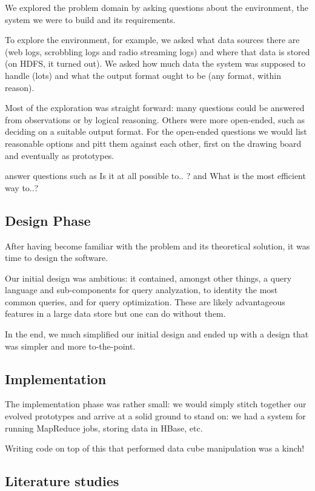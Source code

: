 We explored the problem domain by asking questions about the environment, the
system we were to build and its requirements.

To explore the environment, for example, we asked what data sources there are
(web logs, scrobbling logs and radio streaming logs) and where that data is
stored (on HDFS, it turned out). We asked how much data the system was supposed
to handle (lots) and what the output format ought to be (any format, within
reason).

Most of the exploration was straight forward: many questions could be answered
from observations or by logical reasoning. Others were more open-ended, such as
deciding on a suitable output format. For the open-ended questions we would list
reasonable options and pitt them against each other, first on the drawing board
and eventually as prototypes.

answer questions such as Is it at all possible to.. ? and What is the most
efficient way to..?

\subsection*{Design Phase}

After having become familiar with the problem and its theoretical solution, it
was time to design the software.

Our initial design was ambitious: it contained, amongst other things, a query
language and sub-components for query analyzation, to identity the most common
queries, and for query optimization. These are likely advantageous features in a
large data store but one can do without them.

In the end, we much simplified our initial design and ended up with a design
that was simpler and more to-the-point.

\subsection*{Implementation}

The implementation phase was rather small: we would simply stitch together our evolved prototypes and arrive at a solid ground to stand on: we had a system for running MapReduce jobs, storing data in HBase, etc.

Writing code on top of this that performed data cube manipulation was a kinch!

\subsection*{Literature studies}


